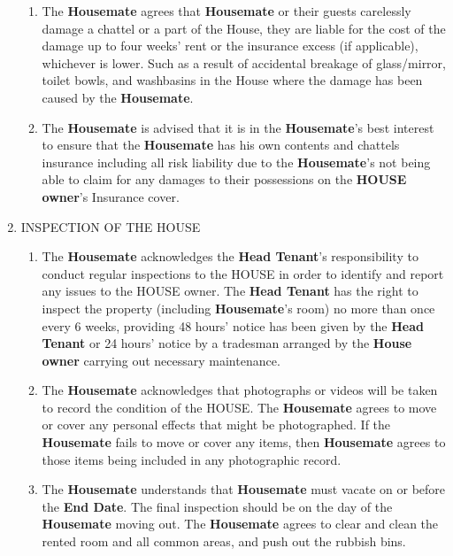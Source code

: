 \documentclass[12pt,a4paper]{article}
\begin{document}
\begin{enumerate}
\begin{enumerate}[label=\alph*.]
    \item The \textbf{Housemate} agrees that \textbf{Housemate} or their guests carelessly damage a chattel or a part of the House, they are liable for the cost of the damage up to four weeks' rent or the insurance excess (if applicable), whichever is lower. Such as a result of accidental breakage of glass/mirror, toilet bowls, and washbasins in the House where the damage has been caused by the \textbf{Housemate}.
    
    \item The \textbf{Housemate} is advised that it is in the \textbf{Housemate}'s best interest to ensure that the \textbf{Housemate} has his own contents and chattels insurance including all risk liability due to the \textbf{Housemate}'s not being able to claim for any damages to their possessions on the \textbf{HOUSE owner}'s Insurance cover.
    \end{enumerate}

\item INSPECTION OF THE HOUSE
    \begin{enumerate}[label=\alph*.]
    \item The \textbf{Housemate} acknowledges the \textbf{Head Tenant}'s responsibility to conduct regular inspections to the HOUSE in order to identify and report any issues to the HOUSE owner. The \textbf{Head Tenant} has the right to inspect the property (including \textbf{Housemate}'s room) no more than once every 6 weeks, providing 48 hours' notice has been given by the \textbf{Head Tenant} or 24 hours' notice by a tradesman arranged by the \textbf{House owner} carrying out necessary maintenance.
    
    \item The \textbf{Housemate} acknowledges that photographs or videos will be taken to record the condition of the HOUSE. The \textbf{Housemate} agrees to move or cover any personal effects that might be photographed. If the \textbf{Housemate} fails to move or cover any items, then \textbf{Housemate} agrees to those items being included in any photographic record.
    
    \item The \textbf{Housemate} understands that \textbf{Housemate} must vacate on or before the \textbf{End Date}. The final inspection should be on the day of the \textbf{Housemate} moving out. The \textbf{Housemate} agrees to clear and clean the rented room and all common areas, and push out the rubbish bins.
    \end{enumerate}


\end{enumerate}
\end{document}
